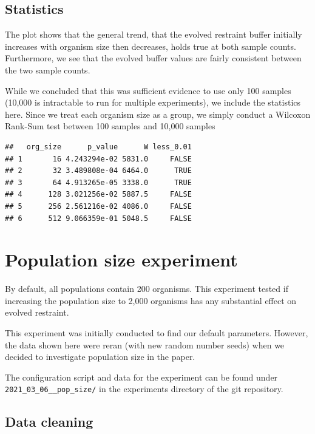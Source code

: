 \documentclass[
]{book}
\begin{document}
\hypertarget{statistics-3}{%
\section{Statistics}\label{statistics-3}}

The plot shows that the general trend, that the evolved restraint buffer initially increases with organism size then decreases, holds true at both sample counts.
Furthermore, we see that the evolved buffer values are fairly consistent between the two sample counts.

While we concluded that this was sufficient evidence to use only 100 samples (10,000 is intractable to run for multiple experiments), we include the statistics here.
Since we treat each organism size as a group, we simply conduct a Wilcoxon Rank-Sum test between 100 samples and 10,000 samples

\begin{verbatim}
##   org_size      p_value      W less_0.01
## 1       16 4.243294e-02 5831.0     FALSE
## 2       32 3.489808e-04 6464.0      TRUE
## 3       64 4.913265e-05 3338.0      TRUE
## 4      128 3.021256e-02 5887.5     FALSE
## 5      256 2.561216e-02 4086.0     FALSE
## 6      512 9.066359e-01 5048.5     FALSE
\end{verbatim}

\hypertarget{population-size-experiment}{%
\chapter{Population size experiment}\label{population-size-experiment}}

By default, all populations contain 200 organisms.
This experiment tested if increasing the population size to 2,000 organisms has any substantial effect on evolved restraint.

This experiment was initially conducted to find our default parameters.
However, the data shown here were reran (with new random number seeds) when we decided to investigate population size in the paper.

The configuration script and data for the experiment can be found under \texttt{2021\_03\_06\_\_pop\_size/} in the experiments directory of the git repository.

\hypertarget{data-cleaning-4}{%
\section{Data cleaning}\label{data-cleaning-4}}
\end{document}
